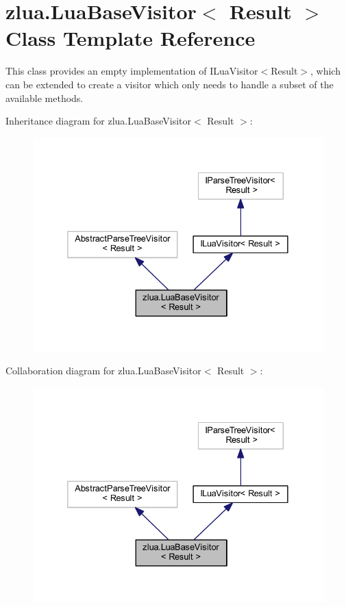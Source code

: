 \hypertarget{classzlua_1_1_lua_base_visitor}{}\section{zlua.\+Lua\+Base\+Visitor$<$ Result $>$ Class Template Reference}
\label{classzlua_1_1_lua_base_visitor}


This class provides an empty implementation of I\+Lua\+Visitor$<$\+Result$>$, which can be extended to create a visitor which only needs to handle a subset of the available methods.  




Inheritance diagram for zlua.\+Lua\+Base\+Visitor$<$ Result $>$\+:
\nopagebreak
\begin{figure}[H]
\begin{center}
\leavevmode
\includegraphics[width=332pt]{classzlua_1_1_lua_base_visitor__inherit__graph}
\end{center}
\end{figure}


Collaboration diagram for zlua.\+Lua\+Base\+Visitor$<$ Result $>$\+:
\nopagebreak
\begin{figure}[H]
\begin{center}
\leavevmode
\includegraphics[width=332pt]{classzlua_1_1_lua_base_visitor__coll__graph}
\end{center}
\end{figure}
